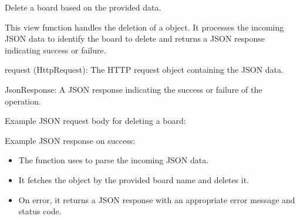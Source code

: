 \documentclass[letterpaper,10pt,english]{sphinxmanual}
\begin{document}

\begin{fulllineitems}
\label{\detokenize{app:app.views.delete_board}}
\pysigstartsignatures
{}
\pysigstopsignatures
\sphinxAtStartPar
Delete a board based on the provided data.

\sphinxAtStartPar
This view function handles the deletion of a  object. 
It processes the incoming JSON data to identify the board to delete and 
returns a JSON response indicating success or failure.
\begin{description}
\sphinxAtStartPar
request (HttpRequest): The HTTP request object containing the JSON data.

\sphinxAtStartPar
JsonResponse: A JSON response indicating the success or failure of the operation.

\sphinxAtStartPar
Example JSON request body for deleting a board:

\begin{sphinxVerbatim}[commandchars=\\\{\}]
\end{sphinxVerbatim}

\sphinxAtStartPar
Example JSON response on success:

\begin{sphinxVerbatim}[commandchars=\\\{\}]
\end{sphinxVerbatim}

\begin{itemize}
\item {} 
\sphinxAtStartPar
The function uses  to parse the incoming JSON data.

\item {} 
\sphinxAtStartPar
It fetches the  object by the provided board name and deletes it.

\item {} 
\sphinxAtStartPar
On error, it returns a JSON response with an appropriate error message and status code.

\end{itemize}

\end{description}

\end{fulllineitems}
\end{document}
